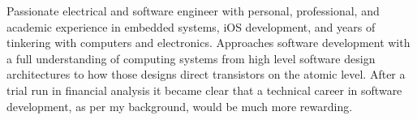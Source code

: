 

\begin{cvparagraph}

Passionate electrical and software engineer with personal, professional, and academic experience in embedded systems, iOS development, and years of tinkering with computers and electronics. Approaches software development with a full understanding of computing systems from high level software design architectures to how those designs direct transistors on the atomic level. After a trial run in financial analysis it became clear that a technical career in software development, as per my background, would be much more rewarding.

\end{cvparagraph}
